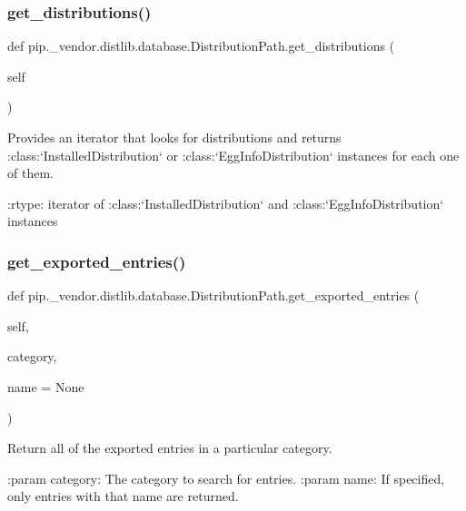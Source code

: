 \subsubsection{\texorpdfstring{get\+\_\+distributions()}{get\_distributions()}}
{\footnotesize\ttfamily def pip.\+\_\+vendor.\+distlib.\+database.\+Distribution\+Path.\+get\+\_\+distributions (\begin{DoxyParamCaption}\item[{}]{self }\end{DoxyParamCaption})}

\begin{DoxyVerb}Provides an iterator that looks for distributions and returns
:class:`InstalledDistribution` or
:class:`EggInfoDistribution` instances for each one of them.

:rtype: iterator of :class:`InstalledDistribution` and
:class:`EggInfoDistribution` instances
\end{DoxyVerb}
 \mbox{\label{classpip_1_1__vendor_1_1distlib_1_1database_1_1DistributionPath_a69e5ea3ce433f4ff77e0fae760f09605}} 
\subsubsection{\texorpdfstring{get\+\_\+exported\+\_\+entries()}{get\_exported\_entries()}}
{\footnotesize\ttfamily def pip.\+\_\+vendor.\+distlib.\+database.\+Distribution\+Path.\+get\+\_\+exported\+\_\+entries (\begin{DoxyParamCaption}\item[{}]{self,  }\item[{}]{category,  }\item[{}]{name = {\ttfamily None} }\end{DoxyParamCaption})}

\begin{DoxyVerb}Return all of the exported entries in a particular category.

:param category: The category to search for entries.
:param name: If specified, only entries with that name are returned.
\end{DoxyVerb}
 \mbox{\label{classpip_1_1__vendor_1_1distlib_1_1database_1_1DistributionPath_aad37e3c8f1659cb307dcd5472a563f96}} 

